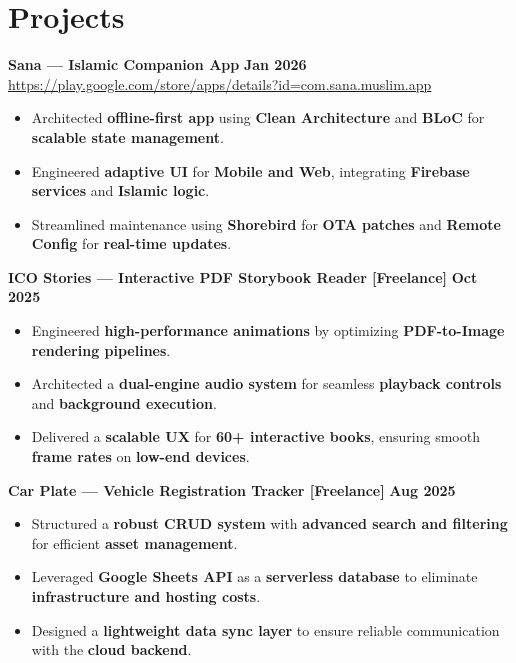 \documentclass[a4paper,11pt]{article}
\newcommand{\entry}[2]{\textbf{#1} \hfill \textbf{#2}}
\begin{document}
\section{Projects}
\noindent\entry{Sana --- Islamic Companion App}{Jan 2026}\\[1pt]
\small\href{https://play.google.com/store/apps/details?id=com.sana.muslim.app}{https://play.google.com/store/apps/details?id=com.sana.muslim.app}\\[2pt]
\begin{itemize}[leftmargin=0.15in, labelsep=0.5em, nosep]
\item \small{Architected \textbf{offline-first app} using \textbf{Clean Architecture} and \textbf{BLoC} for \textbf{scalable state management}.}
\item \small{Engineered \textbf{adaptive UI} for \textbf{Mobile and Web}, integrating \textbf{Firebase services} and \textbf{Islamic logic}.}
\item \small{Streamlined maintenance using \textbf{Shorebird} for \textbf{OTA patches} and \textbf{Remote Config} for \textbf{real-time updates}.}
\end{itemize}
\vspace{6pt}
\noindent\entry{ICO Stories --- Interactive PDF Storybook Reader \normalfont\small[Freelance]}{Oct 2025}\\[2pt]
\begin{itemize}[leftmargin=0.15in, labelsep=0.5em, nosep]
\item \small{Engineered \textbf{high-performance animations} by optimizing \textbf{PDF-to-Image rendering pipelines}.}
\item \small{Architected a \textbf{dual-engine audio system} for seamless \textbf{playback controls} and \textbf{background execution}.}
\item \small{Delivered a \textbf{scalable UX} for \textbf{60+ interactive books}, ensuring smooth \textbf{frame rates} on \textbf{low-end devices}.}
\end{itemize}
\vspace{6pt}
\noindent\entry{Car Plate --- Vehicle Registration Tracker \normalfont\small[Freelance]}{Aug 2025}\\[2pt]
\begin{itemize}[leftmargin=0.15in, labelsep=0.5em, nosep]
\item \small{Structured a \textbf{robust CRUD system} with \textbf{advanced search and filtering} for efficient \textbf{asset management}.}
\item \small{Leveraged \textbf{Google Sheets API} as a \textbf{serverless database} to eliminate \textbf{infrastructure and hosting costs}.}
\item \small{Designed a \textbf{lightweight data sync layer} to ensure reliable communication with the \textbf{cloud backend}.}
\end{itemize}
\end{document}
